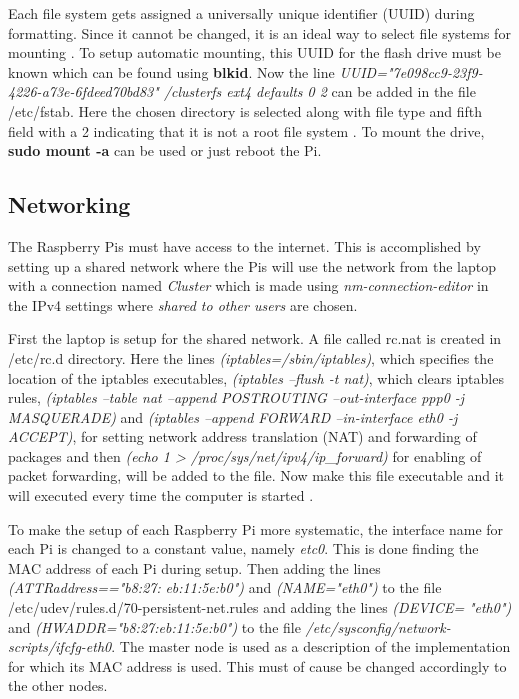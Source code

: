 \documentclass[../Head/Report.tex]{subfiles}
\begin{document}
Each file system gets assigned a universally unique identifier (UUID) during formatting. Since it cannot be changed, it is an ideal way to select file systems for mounting \cite{fstab}. To setup automatic mounting, this UUID for the flash drive must be known which can be found using \textbf{blkid}. Now the line \textit{UUID="7e098cc9-23f9-4226-a73e-6fdeed70bd83" /clusterfs ext4 defaults 0 2} can be added in the file /etc/fstab. Here the chosen directory is selected along with file type and fifth field with a 2 indicating that it is not a root file system \cite{fstab_pass}. To mount the drive, \textbf{sudo mount -a} can be used or just reboot the Pi. 

\subsection{Networking}
The Raspberry Pis must have access to the internet. This is accomplished by setting up a shared network where the Pis will use the network from the laptop with a connection named \textit{Cluster} which is made using \textit{nm-connection-editor} in the IPv4 settings where \textit{shared to other users} are chosen. 

First the laptop is setup for the shared network. A file called rc.nat is created in /etc/rc.d directory. Here the lines \textit{(iptables=/sbin/iptables)}, which specifies the location of the iptables executables, \textit{(iptables --flush -t nat)}, which clears iptables rules, \textit{(iptables --table nat --append POSTROUTING --out-interface ppp0 -j MASQUERADE)} and \textit{(iptables --append FORWARD --in-interface eth0 -j ACCEPT)}, for setting network address translation (NAT) and forwarding of packages and then \textit{(echo 1 > /proc/sys/net/ipv4/ip\_forward)} for enabling of packet forwarding, will be added to the file. Now make this file executable and it will executed every time the computer is started \cite{Networking}.

To make the setup of each Raspberry Pi more systematic, the interface name for each Pi is changed to a constant value, namely \textit{etc0}. This is done finding the MAC address of each Pi during setup. Then adding the lines \textit{(ATTR{address}=="b8:27:} \textit{eb:11:5e:b0")} and \textit{(NAME="eth0")} to the file /etc/udev/rules.d/70-persistent-net.rules and adding the lines \textit{(DEVICE=} \textit{"eth0")} and \textit{(HWADDR="b8:27:eb:11:5e:b0")} to the file  \textit{/etc/sysconfig/network-scripts/ifcfg-eth0}. The master node is used as a description of the implementation for which its MAC address is used. This must of cause be changed accordingly to the other nodes.\cite{Interface_Name}     
\end{document}
